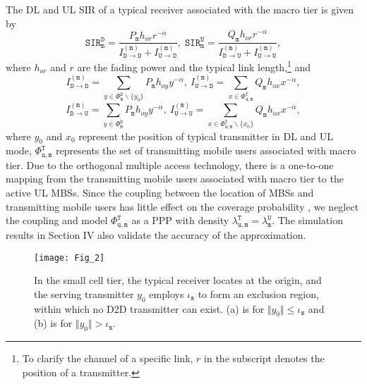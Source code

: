 \documentclass[twocolumn,english]{IEEEtran}
\theoremstyle{plain}
\theoremstyle{definition}
\begin{document}
The DL and UL SIR of a typical receiver associated with the macro
tier is given by
\begin{equation}
\mathtt{SIR}_{\mathtt{m}}^{\mathtt{D}}=\frac{P_{\mathtt{m}}h_{or}r^{-\alpha}}{\ensuremath{I_{\mathtt{D\rightarrow D}}^{\mathtt{(m)}}+I_{\mathtt{U\rightarrow D}}^{\mathtt{(m)}}}},\;\mathtt{SIR_{m}^{U}}=\frac{Q_{\mathtt{m}}h_{or}r^{-\alpha}}{\ensuremath{I_{\mathtt{D\rightarrow U}}^{\mathtt{(m)}}+I_{\mathtt{U\rightarrow U}}^{(\mathtt{m})}}},\label{eq:(15)}
\end{equation}
where $h_{or}$ and $r$ are the fading power and the typical link
length,\footnote{To clarify the channel of a specific link, $r$ in the subscript denotes
the position of a transmitter.} and
\[
I_{\mathtt{D\rightarrow D}}^{\mathtt{(m)}}=\sum_{y\in\Phi_{\mathtt{m}}^{\mathtt{D}}\backslash\{y_{0}\}}P_{\mathtt{m}}h_{oy}y^{-\alpha},\: I_{\mathtt{U\rightarrow D}}^{\mathtt{(m)}}=\sum_{x\in\Phi_{\mathtt{u,m}}^{\mathtt{T}}}Q_{\mathtt{m}}h_{ox}x^{-\alpha},
\]
\[
I_{\mathtt{D\rightarrow U}}^{\mathtt{(m)}}=\sum_{y\in\Phi_{\mathtt{m}}^{\mathtt{D}}}P_{\mathtt{m}}h_{oy}y^{-\alpha},\: I_{\mathtt{U\rightarrow U}}^{(\mathtt{m})}=\sum_{x\in\Phi_{\mathtt{u,m}}^{\mathtt{T}}\backslash\{x_{0}\}}Q_{\mathtt{m}}h_{ox}x^{-\alpha},
\]
where $y_{0}$ and $x_{0}$ represent the position of typical transmitter
in DL and UL mode, $\Phi_{\mathtt{u},\mathtt{m}}^{\mathtt{T}}$ represents
the set of transmitting mobile users associated with macro tier. Due
to the orthogonal multiple access technology, there is a one-to-one
mapping from the transmitting mobile users associated with macro tier
to the active UL MBSs. Since the coupling between the location of
MBSs and transmitting mobile users has little effect on the coverage
probability \cite{CHDD,AMUC}, we neglect the coupling and model $\Phi_{\mathtt{u},\mathtt{m}}^{\mathtt{T}}$
as a PPP with density $\lambda_{\mathtt{u,m}}^{\mathtt{T}}=\lambda_{\mathtt{m}}^{\mathtt{U}}$.
The simulation results in Section IV also validate the accuracy of
the approximation.

{\small{}}
\begin{figure}[t]
{\small{}\centering\texttt{[image: Fig\_2]}\protect\caption{{\small{}\label{fig:D2D_small cell}In the small cell tier, the typical
receiver locates at the origin, and the serving transmitter $y_{0}$
employs $\iota_{\mathtt{s}}$ to form an exclusion region, within
which no D2D transmitter can exist. (a) is for $\Vert y_{0}\Vert\leq\iota_{\mathtt{s}}$
and (b) is for $\Vert y_{0}\Vert>\iota_{\mathtt{s}}$. }}
}
\end{figure}
{\small \par}
\end{document}
